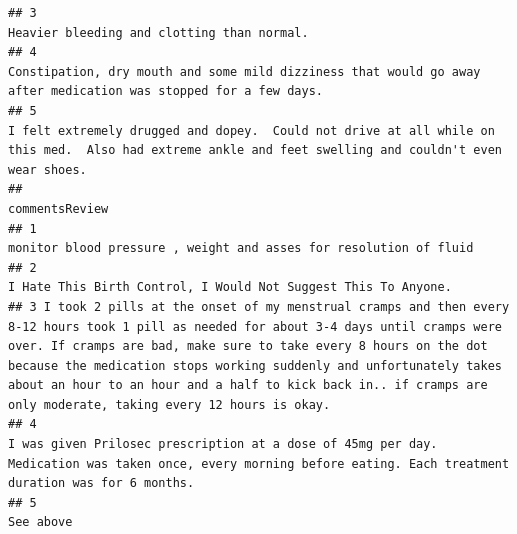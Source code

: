 \documentclass[spanish,]{article}
\begin{document}
\begin{verbatim}
## 3                                                                                                                                                                                                                         Heavier bleeding and clotting than normal.
## 4                                                                                                                                                    Constipation, dry mouth and some mild dizziness that would go away after medication was stopped for a few days.
## 5                                                                                                             I felt extremely drugged and dopey.  Could not drive at all while on this med.  Also had extreme ankle and feet swelling and couldn't even wear shoes.
##                                                                                                                                                                                                                                                                                                                                                                                        commentsReview
## 1                                                                                                                                                                                                                                                                                                                                   monitor blood pressure , weight and asses for resolution of fluid
## 2                                                                                                                                                                                                                                                                                                                                      I Hate This Birth Control, I Would Not Suggest This To Anyone.
## 3 I took 2 pills at the onset of my menstrual cramps and then every 8-12 hours took 1 pill as needed for about 3-4 days until cramps were over. If cramps are bad, make sure to take every 8 hours on the dot because the medication stops working suddenly and unfortunately takes about an hour to an hour and a half to kick back in.. if cramps are only moderate, taking every 12 hours is okay.
## 4                                                                                                                                                                                                                                      I was given Prilosec prescription at a dose of 45mg per day. Medication was taken once, every morning before eating. Each treatment duration was for 6 months.
## 5                                                                                                                                                                                                                                                                                                                                                                                           See above
\end{verbatim}
\end{document}
